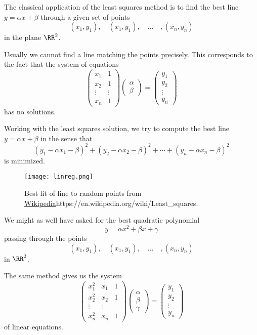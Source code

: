 \documentclass{article}
\begin{document}
\begin{example}
  The classical application of the least squares method is to find
the best line $y = \alpha x + \beta$ through a given set of points
$$
(x_1, y_1), \quad (x_1, y_1), \quad \dots \quad, (x_n, y_n)
$$
in the plane $\RR^2$.

Usually we cannot find a line matching the points precisely. This corresponds to the fact that
the system of equations
$$
\begin{pmatrix}
x_1 & 1\\
x_2 & 1\\
\vdots & \vdots\\
x_n & 1
\end{pmatrix}
\begin{pmatrix}
\alpha \\ \beta
\end{pmatrix}
= 
\begin{pmatrix}
y_1 \\
y_2 \\
\vdots \\
y_n
\end{pmatrix}
$$
has no solutions.

Working with the least squares solution, we try to compute the best
line $y = \alpha x + \beta$ in the sense that
$$
(y_1 -\alpha x_1 -\beta)^2 + (y_2 -\alpha x_2 -\beta)^2 + \cdots +
(y_n -\alpha x_n -\beta)^2 
$$
is minimized.

\begin{figure}
\texttt{[image: linreg.png]}
\caption{Best fit of line to random points from \url{Wikipedia}{https://en.wikipedia.org/wiki/Least_squares}.}
\end{figure}

We might as well have asked for the best quadratic polynomial 
$$
y = \alpha x^2 + \beta x + \gamma 
$$
passing through the points
$$
(x_1, y_1), \quad (x_1, y_1), \quad \dots \quad, (x_n, y_n)
$$
in $\RR^2$.

The same method gives us the system
$$
\begin{pmatrix}
x_1^2 & x_1 & 1\\
x_2 ^2 & x_2 & 1\\
\vdots & \vdots\\
x_n^2 & x_n & 1
\end{pmatrix}
\begin{pmatrix}
\alpha \\ \beta \\ \gamma
\end{pmatrix}
= 
\begin{pmatrix}
y_1 \\
y_2 \\
\vdots \\
y_n
\end{pmatrix}
$$
of linear equations.



\end{example}
\end{document}
